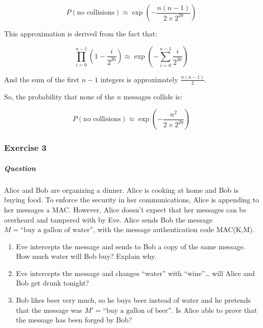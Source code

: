 \documentclass{article}
\begin{document}
                            \[ P(\text{no collisions}) \approx \exp\left(-\frac{n(n-1)}{2 \times 2^{20}}\right) \]
                            
                            This approximation is derived from the fact that:
                            
                            \[ \prod_{i=0}^{n-1} \left(1 - \frac{i}{2^{20}}\right) \approx \exp\left(-\sum_{i=0}^{n-1} \frac{i}{2^{20}}\right) \]
                            
                            And the sum of the first \( n-1 \) integers is approximately \( \frac{n(n-1)}{2} \).
                            
                            So, the probability that none of the \( n \) messages collide is:
                            
                            \[ P(\text{no collisions}) \approx \exp\left(-\frac{n^2}{2 \times 2^{20}}\right) \]

                            \subsubsection{Exercise 3}
                                \subparagraph{Question}
                                Alice and Bob are organizing a dinner. Alice is cooking at home and Bob is buying food. To enforce the security in her communications, Alice is appending to her messages a MAC.
                                However, Alice doesn’t expect that her messages can be overheard and tampered with by Eve.
                                Alice sends Bob the message \( M = \text{``buy a gallon of water''} \), with the message authentication code MAC(K,M).
                                
                                \begin{enumerate}
                                    \item Eve intercepts the message and sends to Bob a copy of the same message. How much water will Bob buy? Explain why.
                                    \item Eve intercepts the message and changes ``water'' with ``wine''… will Alice and Bob get drunk tonight?
                                    \item Bob likes beer very much, so he buys beer instead of water and he pretends that the message was \( M' = \text{``buy a gallon of beer''} \). Is Alice able to prove that the message has been forged by Bob?
                                \end{enumerate}
                                
\end{document}

